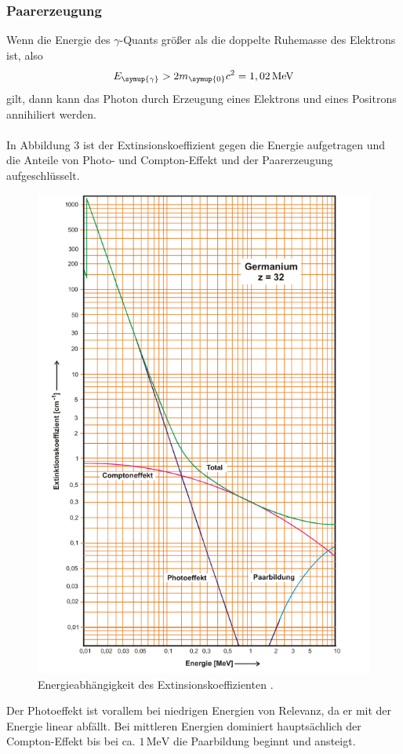 \subsubsection{Paarerzeugung}
\label{sec:Paarerzeugung}
Wenn die Energie des $\gamma$-Quants größer als die doppelte Ruhemasse des Elektrons ist, also
\begin{align*}
    E_{\symup{\gamma}} > 2m_{\symup{0}}c^2 = 1,02\,\unit{\mega\eV}
\end{align*}
gilt, dann kann das Photon durch Erzeugung eines Elektrons und eines Positrons annihiliert werden.\\
\\
In Abbildung 3 ist der Extinsionskoeffizient gegen die Energie aufgetragen und die Anteile von Photo- und
Compton-Effekt und der Paarerzeugung aufgeschlüsselt.
\begin{figure}
    \centering
    \label{fig:Extinsionskoeffizient}
    \includegraphics[scale=0.75]{Bilder/Energieabhaengigkeit.png}
    \caption{Energieabhängigkeit des Extinsionskoeffizienten \cite{sample}.}
\end{figure}
Der Photoeffekt ist vorallem bei niedrigen Energien von Relevanz, da er mit der Energie linear abfällt.
Bei mittleren Energien dominiert hauptsächlich der Compton-Effekt bis bei ca. $1\,\unit{\mega\eV}$ die
Paarbildung beginnt und ansteigt.

